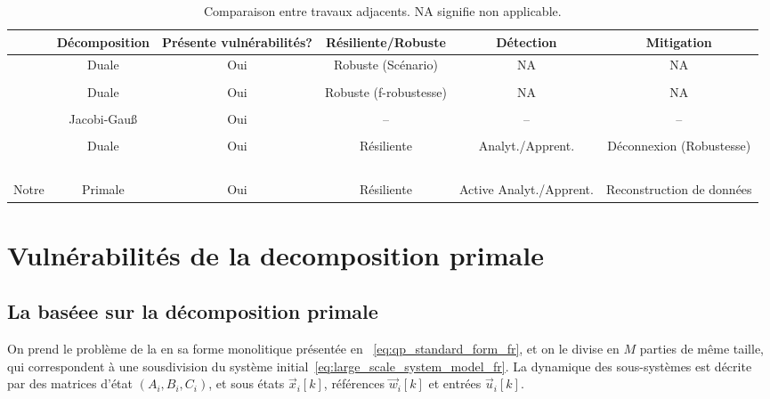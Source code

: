 \documentclass[../main.tex]{subfiles}
\begin{document}
\begin{landscape}
  \vspace*{\fill}
\begin{table}[H]
  \centering
  \begin{tabular}[h]{lccccc}
    \toprule
     & Décomposition & Présente vulnérabilités?  & Résiliente/Robuste & Détection & Mitigation\\
    \midrule
    \parbox{20pt}{\cite{VelardeEtAl2017a}\\ \cite{MaestreEtAl2021}} & Duale & Oui & Robuste (Scénario) & NA & NA\\\\
    \parbox{20pt}{\cite{VelardeEtAl2017b} \\ \cite{VelardeEtAl2018}} & Duale & Oui & Robuste (f-robustesse) & NA & NA\\\\
    \cite{ChanfreutEtAl2018} & Jacobi-Gauß & Oui & -- & -- & --\\\\
    \parbox{40pt}{\cite{AnandutaEtAl2018}\\\cite{AnandutaEtAl2019}\\\cite{AnandutaEtAl2020}} & Duale & Oui & Résiliente& Analyt./Apprent. & Déconnexion (Robustesse)\\\\
    Notre & Primale & Oui & Résiliente & Active Analyt./Apprent. & Reconstruction de données\\
    \bottomrule
  \end{tabular}
  \caption[Comparaison entre travaux adjacents]{Comparaison entre travaux adjacents. NA signifie non applicable.}\label{tab:compare_works_fr}
\end{table}
  \vspace*{\fill}
\end{landscape}

\newpage
\section{Vulnérabilités de la decomposition primale}\label{sec:vulnerabilites-de-la}

\subsection{La \dmpc{} baséee sur la décomposition primale}\label{sec:decomposition_PD_fr}

On prend le problème de la \mpc{} en sa forme monolitique présentée en ~\eqref{eq:qp_standard_form_fr}, et on le divise en $M$ parties de même taille, qui correspondent à une sousdivision du système initial~\eqref{eq:large_scale_system_model_fr}.
La dynamique des sous-systèmes est décrite par des matrices d'état $(A_{i},B_{i},C_{i})$, et sous états $\vec{x}_{i}[k]$, références $\vec{w}_{i}[k]$ et entrées $\vec{u}_{i}[k]$.
\end{document}

